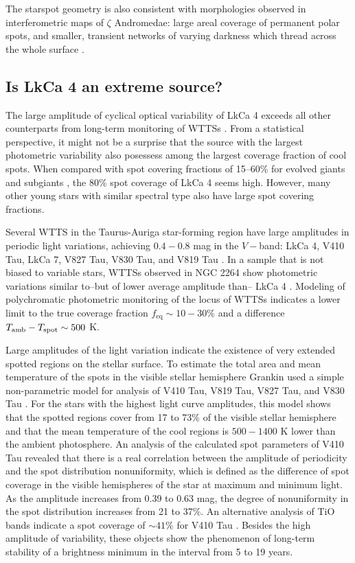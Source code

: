 \documentclass[twocolumn]{emulateapj}%
\newcommand{\name}{LkCa 4 }
\begin{document}
The starspot geometry is also consistent with morphologies observed in interferometric maps of $\zeta$ Andromedae: large areal coverage of permanent polar spots, and smaller, transient networks of varying darkness which thread across the whole surface \citep{roettenbacher16}.


\subsection{Is \name an extreme source?}
The large amplitude of cyclical optical variability of LkCa 4 exceeds all other counterparts from long-term monitoring of WTTSs \citep{grankin08}.  From a statistical perspective, it might not be a surprise that the source with the largest photometric variability also posessess among the largest coverage fraction of cool spots.  When compared with spot covering fractions of 15--60\% for evolved giants and subgiants \citep{chugainov76,berdyugina05}, the 80\% spot coverage of LkCa 4 seems high.  However, many other young stars with similar spectral type also have large spot covering fractions.

Several WTTS in the Taurus-Auriga star-forming region have large amplitudes in periodic light variations, achieving $0.4-0.8$ mag in the $V-$band: LkCa 4, V410 Tau, LkCa 7, V827 Tau, V830 Tau, and V819 Tau \citep{grankin08}.  In a sample that is not biased to variable stars, 
WTTSs observed in NGC 2264 show photometric variations similar to--but of lower average amplitude than-- LkCa 4 \citep{cody14,venuti15}.  Modeling of polychromatic photometric monitoring of the locus of WTTSs indicates a lower limit to the true coverage fraction $f_{\mathrm{eq}}\sim10-30\%$ and a difference $T_\textrm{amb}-T_\textrm{spot}\sim500$ K. 

Large amplitudes of the light variation indicate the existence of very extended spotted regions on the stellar surface. To estimate the total area and mean temperature of the spots in the visible stellar hemisphere Grankin used a simple non-parametric model for analysis of V410 Tau, V819 Tau, V827 Tau, and V830 Tau \citep{grankin98,grankin99}.  For the stars with the highest light curve amplitudes, this model shows that the spotted regions cover from 17 to 73\% of the visible stellar hemisphere and that the mean temperature of the cool regions is $500-1400$ K lower than the ambient photosphere.  An analysis of the calculated spot parameters of V410 Tau revealed that there is a real correlation between the amplitude of periodicity and the spot distribution
nonuniformity, which is defined as the difference of spot coverage in the visible hemispheres of the star at maximum and minimum light. As the amplitude increases from 0.39 to 0.63 mag, the degree of nonuniformity in the spot distribution increases from 21 to 37\%.  An alternative analysis of TiO bands indicate a spot coverage of $\sim 41$\% for V410 Tau \citep{petrov94}.  Besides the high amplitude of variability, these objects show the phenomenon of long-term stability of a brightness minimum in the interval from 5 to 19 years.
\end{document}
